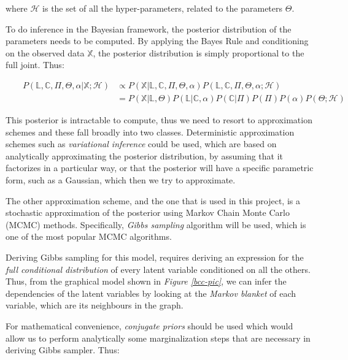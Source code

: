 where $\mathcal{H}$ is the set of all the hyper-parameters, related to the parameters $\Theta$. 

To do inference in the Bayesian framework, the posterior distribution of the parameters needs to be computed. By applying the Bayes Rule and conditioning on the observed data $\mathbb{X}$, the posterior distribution is simply proportional to the full joint. Thus:
 
\begin{equation}\scriptstyle
	\begin{aligned}
	& & \scriptstyle P(\mathbb{L},\mathbb{C},\Pi ,\Theta , \alpha | \mathbb{X}; \mathcal{H}) & \scriptstyle \propto P(\mathbb{X}|\mathbb{L}, \mathbb{C},\Pi ,\Theta , \alpha) P(\mathbb{L}, \mathbb{C}, \Pi , \Theta , \alpha; \mathcal{H}) \\
	& & & \scriptstyle = P(\mathbb{X}|\mathbb{L},\Theta) P(\mathbb{L}|\mathbb{C},\alpha) P(\mathbb{C}|\Pi) P(\Pi) P(\alpha) P(\Theta ; \mathcal{H})
	\end{aligned}
\end{equation}

This posterior is intractable to compute, thus we need to resort to approximation schemes and these fall broadly into two classes. Deterministic approximation schemes such as \emph{variational inference} could be used, which are based on analytically approximating the posterior distribution, by assuming that it factorizes in a particular way, or that the posterior will have a specific parametric form, such as a Gaussian, which then we try to approximate.

The other approximation scheme, and the one that is used in this project, is a stochastic approximation of the posterior using Markov Chain Monte Carlo (MCMC) methods. Specifically, \emph{Gibbs sampling} algorithm will be used, which is one of the most popular MCMC algorithms. 

Deriving Gibbs sampling for this model, requires deriving an expression for the \emph{full conditional distribution} of every latent variable conditioned on all the others. Thus, from the graphical model shown in \emph{Figure \ref{bcc-pic}}, we can infer the dependencies of the latent variables by looking at the \emph{Markov blanket} of each variable, which are its neighbours in the graph. 

For mathematical convenience, \emph{conjugate priors} should be used which would allow us to perform analytically some marginalization steps that are necessary in deriving Gibbs sampler. Thus:

